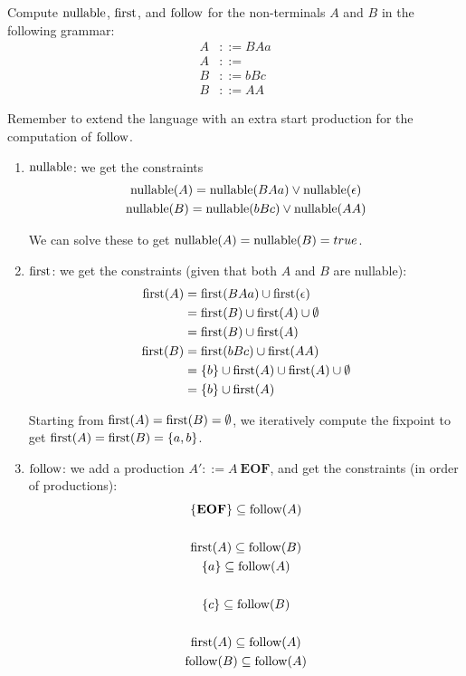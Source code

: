 
\begin{exercise}{}
  Compute \(\operatorname{nullable}\), \(\operatorname{first}\), and \(\operatorname{follow}\) for the non-terminals \(A\)
  and \(B\) in the following grammar:
  \begin{align*}
    A &::= BAa \\
    A &::=  \\
    B &::= bBc \\
    B &::= AA
  \end{align*}

  Remember to extend the language with an extra start production for the
  computation of \(\operatorname{follow}\).

  \begin{solution}
    \begin{enumerate}
      \item \(\operatorname{nullable}\): we get the constraints
      \begin{gather*}
        \operatorname{nullable}(A) = \operatorname{nullable}(BAa) \lor \operatorname{nullable}(\epsilon) \\
        \operatorname{nullable}(B) = \operatorname{nullable}(bBc) \lor \operatorname{nullable}(AA)
      \end{gather*}

      We can solve these to get \(\operatorname{nullable}(A) = \operatorname{nullable}(B) = true\).

      \item \(\operatorname{first}\): we get the constraints (given that both \(A\) and \(B\)
      are nullable):
      \begin{align*}
        \operatorname{first}(A) &= \operatorname{first}(BAa) \cup \operatorname{first}(\epsilon) \\
                  &= \operatorname{first}(B) \cup \operatorname{first}(A) \cup \emptyset \\
                  &= \operatorname{first}(B) \cup \operatorname{first}(A) \\
        \operatorname{first}(B) &= \operatorname{first}(bBc) \cup \operatorname{first}(AA) \\
                  &= \{b\} \cup \operatorname{first}(A) \cup \operatorname{first}(A) \cup \emptyset \\
                  &= \{b\} \cup \operatorname{first}(A)
      \end{align*}

      Starting from \(\operatorname{first}(A) = \operatorname{first}(B) = \emptyset\), we iteratively
      compute the fixpoint to get \(\operatorname{first}(A) = \operatorname{first}(B) = \{a, b\}\).

      \item \(\operatorname{follow}\): we add a production \(A' ::= A~\mathbf{EOF}\), and get
      the constraints (in order of productions):
      \begin{gather*}
        \{\mathbf{EOF}\} \subseteq \operatorname{follow}(A) \\
        \\
        \operatorname{first}(A) \subseteq \operatorname{follow}(B) \\
        \{a\} \subseteq \operatorname{follow}(A) \\
        \\
        \{c\} \subseteq \operatorname{follow}(B) \\
        \\
        \operatorname{first}(A) \subseteq \operatorname{follow}(A) \\
        \operatorname{follow}(B) \subseteq \operatorname{follow}(A)
      \end{gather*}


\end{enumerate}
\end{solution}
\end{exercise}
